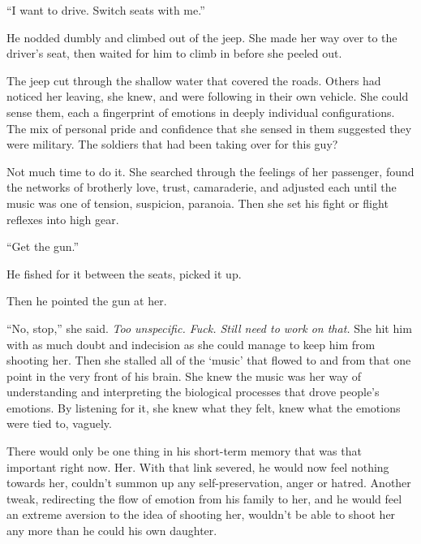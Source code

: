``I want to drive.  Switch seats with me.''



He nodded dumbly and climbed out of the jeep.  She made her way over to the driver's seat, then waited for him to climb in before she peeled out.



The jeep cut through the shallow water that covered the roads.  Others had noticed her leaving, she knew, and were following in their own vehicle.  She could sense them, each a  fingerprint of emotions in deeply individual configurations.  The mix of personal pride and confidence that she sensed in them suggested they were military.  The soldiers that had been taking over for this guy?



Not much time to do it.  She searched through the feelings of her passenger, found the networks of brotherly love, trust, camaraderie, and adjusted each until the music was one of tension, suspicion, paranoia.  Then she set his fight or flight reflexes into high gear.



``Get the gun.''



He fished for it between the seats, picked it up.



Then he pointed the gun at her.



``No, stop,'' she said.  \emph{Too unspecific.  Fuck.  Still need to work on that.} She hit him with as much doubt and indecision as she could manage to keep him from shooting her.  Then she stalled all of the `music' that flowed to and from that one point in the very front of his brain.  She knew the music was her way of understanding and interpreting the biological processes that drove people's emotions.  By listening for it, she knew what they felt, knew what the emotions were tied to, vaguely.



There would only be one thing in his short-term memory that was that important right now.  Her.  With that link severed, he would now feel nothing towards her, couldn't summon up any self-preservation, anger or hatred.  Another tweak, redirecting the flow of emotion from his family to her, and he would feel an extreme aversion to the idea of shooting her, wouldn't be able to shoot her any more than he could his own daughter.



